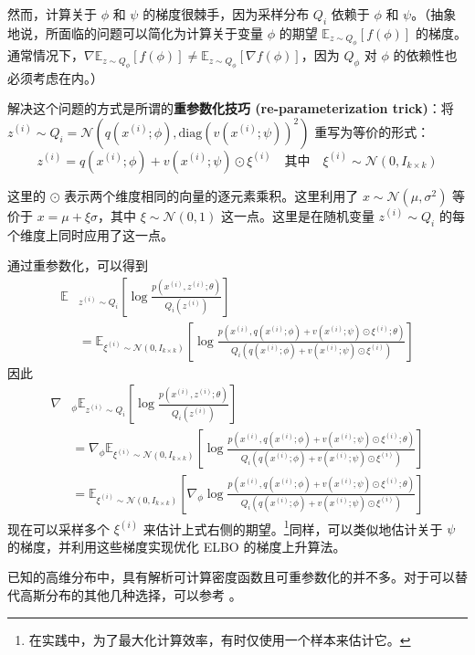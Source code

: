 然而，计算关于 $\phi$ 和 $\psi$ 的梯度很棘手，因为采样分布 $Q_i$ 依赖于 $\phi$ 和 $\psi$。（抽象地说，所面临的问题可以简化为计算关于变量 $\phi$ 的期望 $\mathbb{E}_{z \sim Q_\phi} [f(\phi)]$ 的梯度。通常情况下，$\nabla \mathbb{E}_{z \sim Q_\phi} [f(\phi)] \neq \mathbb{E}_{z \sim Q_\phi} [\nabla f(\phi)]$，因为 $Q_\phi$ 对 $\phi$ 的依赖性也必须考虑在内。）

解决这个问题的方式是所谓的\textbf{重参数化技巧 (re-parameterization trick)}：将 $z^{(i)} \sim Q_i = \mathcal{N}(q(x^{(i)}; \phi), \text{diag}(v(x^{(i)}; \psi))^2)$ 重写为等价的形式：
\begin{equation}
    z^{(i)} = q(x^{(i)}; \phi) + v(x^{(i)}; \psi) \odot \xi^{(i)} \quad \text{其中} \quad \xi^{(i)} \sim \mathcal{N}(0, I_{k \times k}) \label{eq:11.24}
\end{equation}

这里的 $\odot$ 表示两个维度相同的向量的逐元素乘积。这里利用了 $x \sim \mathcal{N}(\mu, \sigma^2)$ 等价于 $x = \mu + \xi \sigma$，其中 $\xi \sim \mathcal{N}(0, 1)$ 这一点。这里是在随机变量 $z^{(i)} \sim Q_i$ 的每个维度上同时应用了这一点。

通过重参数化，可以得到
\begin{align}
    \mathbb{E}&_{z^{(i)} \sim Q_i} \left[ \log \frac{p(x^{(i)}, z^{(i)}; \theta)}{Q_i(z^{(i)})} \right] \label{eq:11.25}\\
    &= \mathbb{E}_{\xi^{(i)} \sim \mathcal{N}(0, I_{k \times k})} \left[ \log \frac{p(x^{(i)}, q(x^{(i)}; \phi) + v(x^{(i)}; \psi) \odot \xi^{(i)}; \theta)}{Q_i(q(x^{(i)}; \phi) + v(x^{(i)}; \psi) \odot \xi^{(i)})} \right] \nonumber
\end{align}
因此
\begin{align*}
    \nabla&_\phi \mathbb{E}_{z^{(i)} \sim Q_i} \left[ \log \frac{p(x^{(i)}, z^{(i)}; \theta)}{Q_i(z^{(i)})} \right] \\
    &= \nabla_\phi \mathbb{E}_{\xi^{(i)} \sim \mathcal{N}(0, I_{k \times k})} \left[ \log \frac{p(x^{(i)}, q(x^{(i)}; \phi) + v(x^{(i)}; \psi) \odot \xi^{(i)}; \theta)}{Q_i(q(x^{(i)}; \phi) + v(x^{(i)}; \psi) \odot \xi^{(i)})} \right] \\
    &= \mathbb{E}_{\xi^{(i)} \sim \mathcal{N}(0, I_{k \times k})} \left[ \nabla_\phi \log \frac{p(x^{(i)}, q(x^{(i)}; \phi) + v(x^{(i)}; \psi) \odot \xi^{(i)}; \theta)}{Q_i(q(x^{(i)}; \phi) + v(x^{(i)}; \psi) \odot \xi^{(i)})} \right]
\end{align*}
现在可以采样多个 $\xi^{(i)}$ 来估计上式右侧的期望。\footnote{在实践中，为了最大化计算效率，有时仅使用一个样本来估计它。}同样，可以类似地估计关于 $\psi$ 的梯度，并利用这些梯度实现优化 ELBO 的梯度上升算法。

已知的高维分布中，具有解析可计算密度函数且可重参数化的并不多。对于可以替代高斯分布的其他几种选择，可以参考 \cite{kingma2013auto}。



